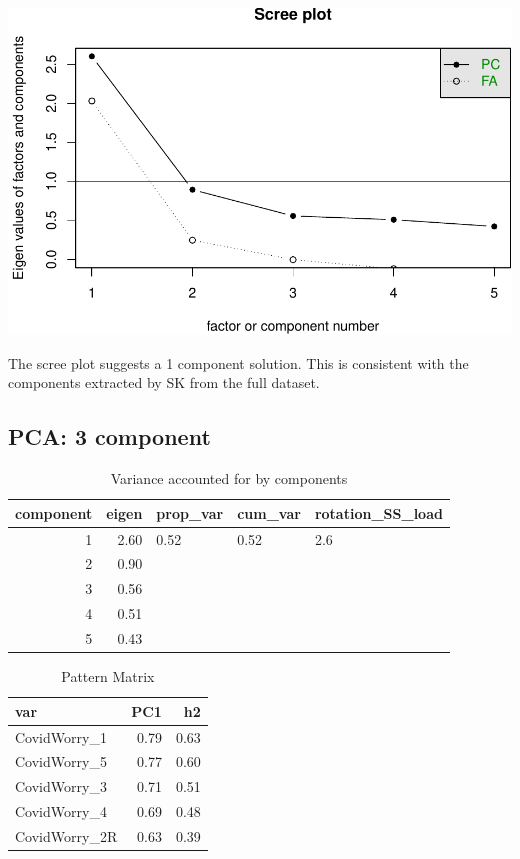 \documentclass[]{article}
\begin{document}
\includegraphics{PCA_covid_files/figure-latex/unnamed-chunk-70-1.pdf}

The scree plot suggests a 1 component solution. This is consistent with
the components extracted by SK from the full dataset.

\hypertarget{pca-3-component-3}{%
\subsection{PCA: 3 component}\label{pca-3-component-3}}

\begin{table}[H]

\caption{\label{tab:unnamed-chunk-71}Variance accounted for by components}
\centering
\fontsize{6}{8}\selectfont
\begin{tabular}[t]{rrlll}
\toprule
component & eigen & prop\_var & cum\_var & rotation\_SS\_load\\
\midrule
1 & 2.60 & 0.52 & 0.52 & 2.6\\
2 & 0.90 &  &  & \\
3 & 0.56 &  &  & \\
4 & 0.51 &  &  & \\
5 & 0.43 &  &  & \\
\bottomrule
\end{tabular}
\end{table}

\begin{table}[H]

\caption{\label{tab:unnamed-chunk-71}Pattern Matrix}
\centering
\fontsize{6}{8}\selectfont
\begin{tabular}[t]{lrr}
\toprule
var & PC1 & h2\\
\midrule
CovidWorry\_1 & 0.79 & 0.63\\
CovidWorry\_5 & 0.77 & 0.60\\
CovidWorry\_3 & 0.71 & 0.51\\
CovidWorry\_4 & 0.69 & 0.48\\
CovidWorry\_2R & 0.63 & 0.39\\
\bottomrule
\end{tabular}
\end{table}
\end{document}
